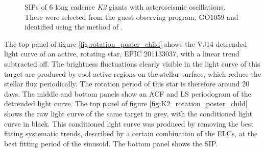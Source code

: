 \documentclass[useAMS, usenatbib, preprint, 12pt]{aastex}
\newcommand{\rpc}{201133037}
\begin{document}
\begin{figure}
\begin{center}
{        }
    \end{center}
    \caption{SIPs of 6 long cadence {\it K2} giants with asteroseismic
	    oscillations.
	    These were selected from the guest observing program, GO1059 and
	    identified using the method of \citet{Huber2009}.
\label{fig:astero_examples}}
\end{figure}

The top panel of figure \ref{fig:rotation_poster_child} shows the
VJ14-detrended light curve of an active, rotating star, EPIC \rpc, with
a linear trend subtracted off.
The brightness fluctuations clearly visible in the light curve of this target
are produced by cool active regions on the stellar surface, which reduce
the stellar flux periodically.
The rotation period of this star is therefore around 20 days.
The middle and bottom panels show an ACF and LS periodogram of the
detrended light curve.
The top panel of figure \ref{fig:K2_rotation_poster_child} shows the raw light
curve of the same target in grey,  with the conditioned light curve in black.
This conditioned light curve was produced by removing the best fitting
systematic trends, described by a certain combination of the ELCs, at the best
fitting period of the sinusoid.
The bottom panel shows the SIP.
\end{document}
